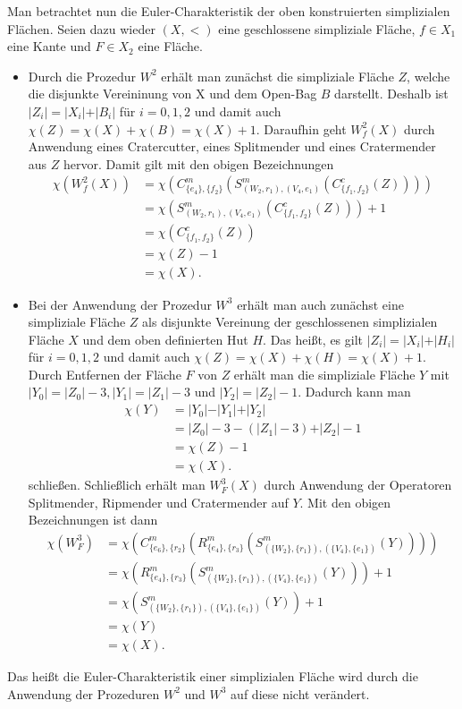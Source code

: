 \documentclass[12pt,titlepage,twoside,cleardoublepage]{article}
\theoremstyle{nummermitklammern}
\numberwithin{equation}{section}
\begin{document}
Man betrachtet nun die Euler-Charakteristik der oben konstruierten simplizialen Flächen. Seien dazu wieder $(X,<)$ eine geschlossene simpliziale Fläche, $f\in X_1$ eine Kante und $F\in X_2$ eine Fläche.
\begin{itemize}
\item Durch die Prozedur $W^2$ erhält man zunächst die simpliziale Fläche $Z$, welche die disjunkte Vereininung von X und dem Open-Bag $B$ darstellt. Deshalb ist $\vert Z_i\vert= \vert X_i \vert+\vert B_i\vert$ für $i=0,1,2$ und damit auch $\chi(Z)=\chi(X)+\chi(B)=\chi(X)+1.$ Daraufhin geht $W^2_f(X)$ durch Anwendung eines Cratercutter, eines Splitmender und eines Cratermender aus $Z$ hervor. Damit gilt mit den obigen Bezeichnungen 
\begin{align*}
\chi(W^2_f(X))&=\chi(C_{\{e_4\},\{f_2\}}^m(S^m_{(W_2,r_1),(V_4,e_1)}(C_{\{f_1,f_2\}}^c(Z))))\\
&=\chi(S^m_{(W_2,r_1),(V_4,e_1)}(C_{\{f_1,f_2\}}^c(Z)))+1\\
&=\chi(C_{\{f_1,f_2\}}^c(Z))\\
&=\chi(Z)-1\\
&=\chi(X).
\end{align*}

\item Bei der Anwendung der Prozedur $W^3$ erhält man auch zunächst eine simpliziale Fläche $Z$ als disjunkte Vereinung der geschlossenen simplizialen Fläche $X$ und dem oben definierten Hut $H$. Das heißt, es gilt $\vert Z_i\vert= \vert X_i \vert+\vert H_i\vert$ für $i=0,1,2$ und damit auch $\chi(Z)=\chi(X)+\chi(H)=\chi(X)+1.$ Durch Entfernen der Fläche $F$ von $Z$ erhält man die simpliziale Fläche $Y$ mit $\vert Y_0\vert= \vert Z_0 \vert-3,\vert Y_1\vert= \vert Z_1 \vert-3$ und $\vert Y_2\vert= \vert Z_2 \vert-1$. Dadurch kann man 
\begin{align*}
\chi(Y)&=\vert Y_0 \vert-\vert Y_1 \vert+\vert Y_2 \vert\\
&=\vert Z_0 \vert-3-(\vert Z_1 \vert-3)+\vert Z_2 \vert-1\\
&=\chi(Z)-1\\
&=\chi(X).
\end{align*}
schließen. Schließlich erhält man $W^3_F(X)$ durch Anwendung der Operatoren Splitmender, Ripmender und Cratermender auf $Y$. Mit den obigen Bezeichnungen ist dann 
\begin{align*}
\chi(W_F^3)&=\chi(C^m_{\{e_6\},\{r_2\}}(R^m_{\{e_4\},\{r_3\}}(S^m_{(\{W_2\},\{r_1\}),(\{V_4\},\{e_1\})}(Y))))\\
&=\chi(R^m_{\{e_4\},\{r_3\}}(S^m_{(\{W_2\},\{r_1\}),(\{V_4\},\{e_1\})}(Y)))+1\\
&=\chi(S^m_{(\{W_2\},\{r_1\}),(\{V_4\},\{e_1\})}(Y))+1\\
&=\chi(Y)\\
&=\chi(X).
\end{align*}
\end{itemize}
Das heißt die Euler-Charakteristik einer simplizialen Fläche wird durch die Anwendung der Prozeduren $W^2$ und $W^3$ auf diese nicht verändert.
\end{document}
